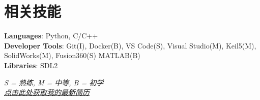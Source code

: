 \documentclass[letterpaper,11pt]{article}
\begin{document}
%
\section{相关技能}
 \begin{itemize}[leftmargin=0.15in, label={}]
    \small{\item{
     \textbf{Languages}{: Python, C/C++} \\
     \textbf{Developer Tools}{: Git(I), Docker(B), VS Code(S), Visual Studio(M), Keil5(M), SolidWorks(M), Fusion360(S) MATLAB(B)} \\
     \textbf{Libraries}{: SDL2}
    }}
 \end{itemize}
\small{\textit{S = 熟练, M = 中等, B = 初学}}\\
\small{\textit{\href{https://github.com/cailikelog/resume/releases/latest/download/LikeCAI-Resume-CN.pdf}{点击此处获取我的最新简历}}}


\end{document}
